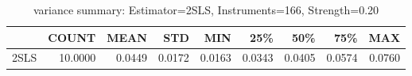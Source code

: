\begin{table}[ht]
\centering
\caption{variance summary: Estimator=2SLS, Instruments=166, Strength=0.20}
\begin{tabular}{lrrrrrrrr}
\toprule
 & COUNT & MEAN & STD & MIN & 25\% & 50\% & 75\% & MAX \\
\midrule
2SLS & 10.0000 & 0.0449 & 0.0172 & 0.0163 & 0.0343 & 0.0405 & 0.0574 & 0.0760 \\
\bottomrule
\end{tabular}
\end{table}
